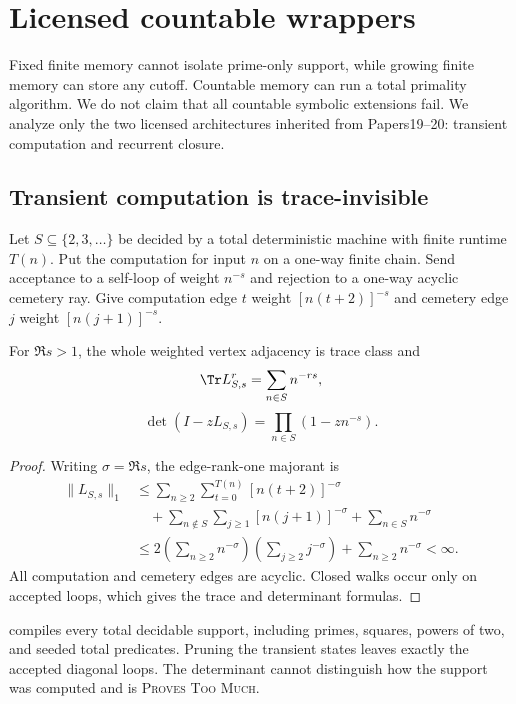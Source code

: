 \section{Licensed countable wrappers}
\label{sec:countable}

Fixed finite memory cannot isolate prime-only support, while growing finite
memory can store any cutoff.  Countable memory can run a total primality
algorithm.  We do not claim that all countable symbolic extensions fail.
We analyze only the two licensed architectures inherited from Papers19--20:
transient computation and recurrent closure.

\subsection{Transient computation is trace-invisible}

\begin{theorem}
\label{thm:transient}
Let \(S\subseteq\{2,3,\ldots\}\) be decided by a total deterministic
machine with finite runtime \(T(n)\).  Put the computation for input \(n\)
on a one-way finite chain.  Send acceptance to a self-loop of weight
\(n^{-s}\) and rejection to a one-way acyclic cemetery ray.  Give
computation edge \(t\) weight \([n(t+2)]^{-s}\) and cemetery edge \(j\)
weight \([n(j+1)]^{-s}\).

For \(\Re s>1\), the whole weighted vertex adjacency is trace class and
\[
        \Tr L_{S,s}^r=\sum_{n\in S}n^{-rs},
\]
\[
        \det(I-zL_{S,s})
        =\prod_{n\in S}(1-zn^{-s}).
\]
\end{theorem}

\begin{proof}
Writing \(\sigma=\Re s\), the edge-rank-one majorant is
\[
\begin{aligned}
\|L_{S,s}\|_1
&\le
\sum_{n\ge2}\sum_{t=0}^{T(n)}[n(t+2)]^{-\sigma}\\
&\quad+
\sum_{n\notin S}\sum_{j\ge1}[n(j+1)]^{-\sigma}
+\sum_{n\in S}n^{-\sigma}\\
&\le
2\left(\sum_{n\ge2}n^{-\sigma}\right)
 \left(\sum_{j\ge2}j^{-\sigma}\right)
+\sum_{n\ge2}n^{-\sigma}<\infty.
\end{aligned}
\]
All computation and cemetery edges are acyclic.  Closed walks occur only on
accepted loops, which gives the trace and determinant formulas.
\end{proof}

\begin{corollary}
\label{cor:selector}
 compiles every total decidable support, including
primes, squares, powers of two, and seeded total predicates.  Pruning the
transient states leaves exactly the accepted diagonal loops.  The
determinant cannot distinguish how the support was computed and is
\textup{\textsc{Proves Too Much}}.
\end{corollary}

